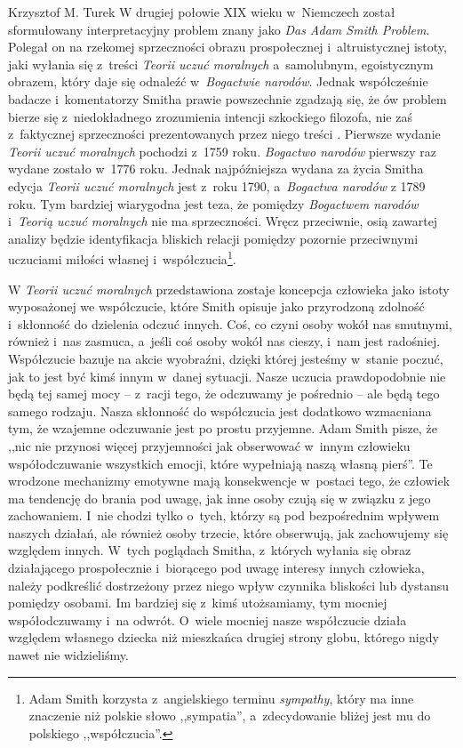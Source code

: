 \begin{artplenv}{Krzysztof M. Turek}
W drugiej połowie XIX wieku w~Niemczech został sformułowany interpretacyjny problem znany jako \textit{Das Adam Smith
Problem}. Polegał on na rzekomej sprzeczności obrazu prospołecznej i~altruistycznej istoty, jaki wyłania się z~treści
\textit{Teorii uczuć moralnych} a~samolubnym, egoistycznym obrazem, który daje się odnaleźć w~\textit{Bogactwie narodów}.
Jednak współcześnie badacze i~komentatorzy Smitha prawie powszechnie zgadzają się, że ów problem bierze
się z~niedokładnego zrozumienia intencji szkockiego filozofa, nie zaś z~faktycznej sprzeczności prezentowanych przez niego
treści
\parencite{wilson_adam_2006}.
Pierwsze wydanie \textit{Teorii uczuć moralnych} pochodzi z~1759
roku. \textit{Bogactwo narodów} pierwszy raz wydane zostało w~1776 roku. Jednak
najpóźniejsza wydana za życia Smitha edycja \textit{Teorii uczuć moralnych} jest z~roku 1790, a~\textit{Bogactwa narodów} z 1789 roku. Tym
bardziej wiarygodna jest teza, że pomiędzy \textit{Bogactwem narodów} i~\textit{Teorią uczuć moralnych} nie ma sprzeczności. Wręcz przeciwnie,
osią zawartej analizy będzie identyfikacja bliskich relacji pomiędzy pozornie przeciwnymi uczuciami miłości
własnej i~współczucia\footnote{Adam Smith korzysta z~angielskiego terminu \textit{sympathy},
który ma inne znaczenie niż polskie
słowo ,,sympatia'', a~zdecydowanie bliżej jest mu do polskiego ,,współczucia''.}.

W \textit{Teorii uczuć moralnych} przedstawiona zostaje koncepcja człowieka jako istoty wyposażonej we współczucie,
które Smith opisuje jako przyrodzoną zdolność i~skłonność do dzielenia odczuć innych. Coś, co czyni osoby wokół nas
smutnymi, również i~nas zasmuca, a~jeśli coś osoby wokół nas cieszy, i~nam jest radośniej. Współczucie bazuje na akcie
wyobraźni, dzięki której jesteśmy w~stanie poczuć, jak to jest być kimś innym w~danej sytuacji. Nasze uczucia
prawdopodobnie nie będą tej samej mocy -- z~racji tego, że odczuwamy je pośrednio -- ale będą tego samego rodzaju. Nasza
skłonność do współczucia jest dodatkowo wzmacniana tym, że wzajemne odczuwanie jest po prostu przyjemne. Adam Smith
\parencite*[s.~9]{smith_theory_2005}
pisze, że ,,nic nie przynosi więcej przyjemności jak obserwować w~innym człowieku
współodczuwanie wszystkich emocji, które wypełniają naszą własną pierś''. Te wrodzone mechanizmy emotywne mają
konsekwencje w~postaci tego, że człowiek ma tendencję do brania pod uwagę, jak inne osoby czują się w związku z jego zachowaniem.
I~nie chodzi tylko o~tych, którzy są pod bezpośrednim wpływem naszych działań, ale również osoby trzecie,
które obserwują, jak zachowujemy się względem innych. W~tych poglądach Smitha, z~których wyłania się obraz działającego
prospołecznie i~biorącego pod uwagę interesy innych człowieka, należy podkreślić dostrzeżony przez niego wpływ czynnika
bliskości lub dystansu pomiędzy osobami. Im bardziej się z~kimś utożsamiamy, tym mocniej współodczuwamy i~na
odwrót. O~wiele mocniej nasze współczucie działa względem własnego dziecka niż mieszkańca drugiej strony globu, którego nigdy
nawet nie widzieliśmy.


\end{artplenv}
